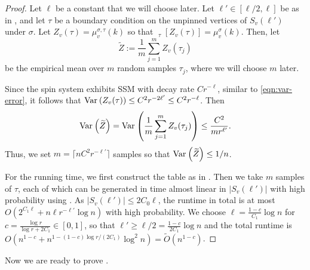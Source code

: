 \documentclass{theoretics}
\newcommand{\Ex}{\mathop{\mathbb{{}E}}\nolimits}
\newcommand{\abs}[1]{\ensuremath{\left\vert#1\right\vert}}
\newcommand{\Var}[2]{\ensuremath{\textnormal{Var}_{#1}\left(#2\right)}}
\newcommand{\defeq}{:=}
\begin{document}
\begin{proof}
  Let $\ell$ be a constant that we will choose later.
  Let $\ell'\in[\ell/2,\ell]$ be as in ,
  and let $\tau$ be a boundary condition on the unpinned vertices of $S_{v}(\ell')$ under $\sigma$.
  Let $Z_{v}(\tau)=\mu_{v}^{\sigma,\tau}(k)$ so that $\Ex_\tau[Z_{v}(\tau)]=\mu_{v}^{\sigma}(k)$. 
  Then, let
  \[\widetilde{Z}\defeq\frac{1}{m}\sum_{j=1}^mZ_{v}(\tau_j)\]
  be the empirical mean over $m$ random samples $\tau_j$,
  where we will choose $m$ later. 

  Since the spin system exhibits SSM with decay rate $Cr^{-\ell}$,
  similar to \eqref{eqn:var-error},
  it follows that $\Var{}{Z_{v}(\tau)}\le C^2r^{-2\ell'}\le C^2r^{-\ell}$. Then
  \[\Var{}{\widetilde{Z}}=\Var{}{\frac{1}{m}\sum_{j=1}^mZ_{v}(\tau_j)}\le\frac{C^2}{mr^{\ell'}}.\]
  Thus, we set $m=\lceil nC^2r^{-\ell'} \rceil$ samples so that $\Var{}{\widetilde{Z}}\leq 1/n$. 

  For the running time,
  we first construct the table as in .
  Then we take $m$ samples of $\tau$, each of which can be generated in time almost linear in $\abs{S_{v}(\ell')}$ with high probability using .
  As $\abs{S_{v}(\ell')}\le 2C_0\ell$,
  the runtime in total is at most $O(2^{C_1\ell}+n\ell r^{-\ell'}\log n)$ with high probability.
  We choose $\ell=\frac{1-c}{C_1}\log n$ for $c=\frac{\log r}{\log r+2C_1}\in[0,1]$,
  so that $\ell' \geq \ell /2 = \frac{1-c}{2C_1} \log n$  and the total runtime is $O(n^{1-c}+n^{1-(1-c)\log r/(2C_1)}\log^2 n)=\widetilde{O}(n^{1-c})$.
\end{proof}

Now we are ready to prove . 
\end{document}
